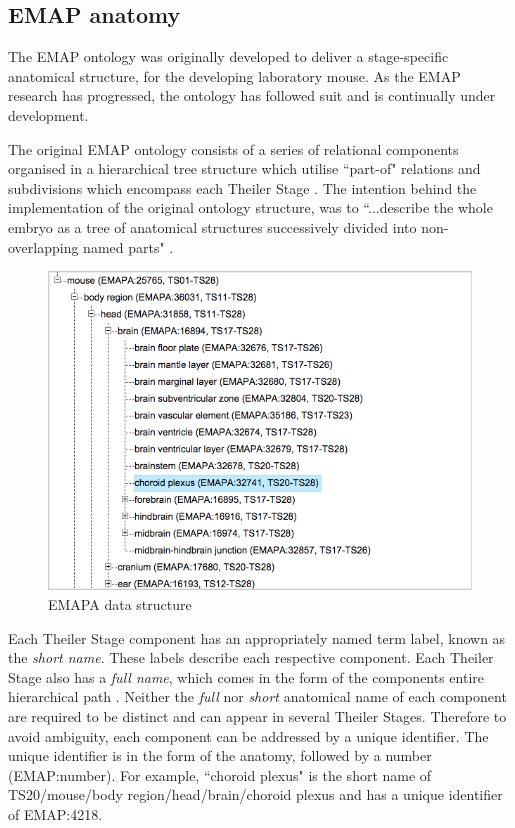 \subsection{EMAP anatomy}
The EMAP ontology was originally developed to deliver a stage-specific anatomical structure, for the developing laboratory mouse. As the EMAP research has progressed, the ontology has followed suit and is continually under development.

The original EMAP ontology consists of a series of relational components organised in a hierarchical tree structure which utilise ``part-of" relations and subdivisions which encompass each Theiler Stage \cite{emap}. The intention behind the implementation of the original ontology structure, was to ``...describe the whole embryo as a tree of anatomical structures successively divided into non-overlapping named parts" \cite{emap}.

\begin{figure}[H]\begin{center}\includegraphics[width=1\linewidth]{images/emapachoroidplexus}\caption{EMAPA data structure}\label{fig:emapa}\end{center}\end{figure}

Each Theiler Stage component has an appropriately named term label, known as the \textit{short name}. These labels describe each respective component. Each Theiler Stage also has a \textit{full name}, which comes in the form of the components entire hierarchical path \cite{emap}. Neither the \textit{full} nor \textit{short} anatomical name of each component are required to be distinct and can appear in several Theiler Stages. Therefore to avoid ambiguity, each component can be addressed by a unique identifier. The unique identifier is in the form of the anatomy, followed by a number (EMAP:number). For example, ``choroid plexus" is the short name of TS20/mouse/body region/head/brain/choroid plexus and has a unique identifier of EMAP:4218.

